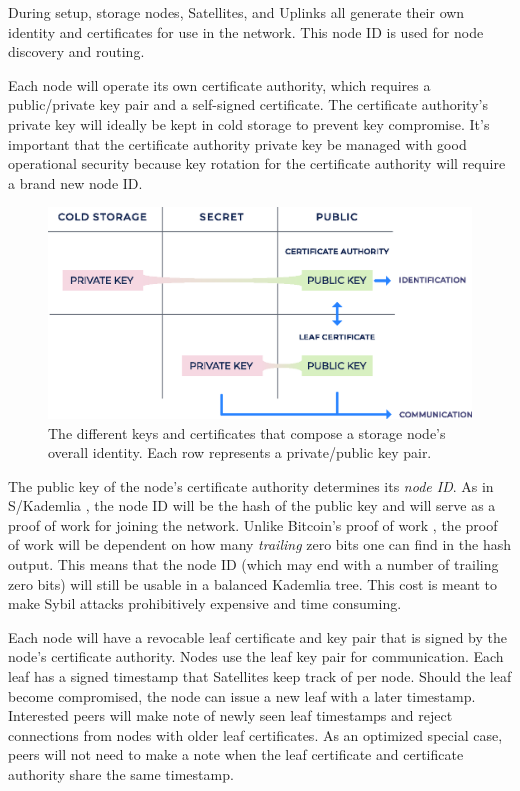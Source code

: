\documentclass[8pt,fleqn,openany]{book}
\begin{document}
During setup, storage nodes, Satellites, and Uplinks all generate their own
identity and certificates for use in the network.
This node ID is used for node discovery and routing.

Each node will operate its own certificate authority, which requires a
public/private key pair and a self-signed certificate. The certificate
authority's private key will ideally be kept in cold storage to prevent key
compromise.
It's important that the certificate authority private key be managed with good
operational security because key rotation for the certificate authority will
require a brand new node ID.

\begin{figure}[!htbp]
\centering
\includegraphics[width=.8\textwidth]{images/identity.eps}
\caption{The different keys and certificates that compose a storage node's
overall identity. Each row represents a private/public key pair.}
\end{figure}

The public key of the node's certificate authority determines its {\em node ID}.
As in S/Kademlia \cite{skad}, the node ID will be the hash of the public key
and will serve as a proof of work for joining the network. Unlike Bitcoin's
proof of work \cite{bitcoin}, the proof of work will be dependent on how many
{\em trailing}
zero bits one can find in the hash output. This means that the node ID (which
may end with a number of trailing zero bits) will
still be usable in a balanced Kademlia \cite{kad} tree.
This cost is meant to make Sybil attacks prohibitively expensive and time
consuming.

Each node will have a revocable leaf certificate and key pair that is signed by
the node's certificate authority. Nodes use the leaf key pair for
communication. Each leaf has a signed timestamp that Satellites
keep track of per node. Should the leaf become compromised, the node can issue
a new leaf with a later timestamp. Interested peers will make note of newly
seen leaf timestamps and reject connections from nodes with older leaf
certificates. As an optimized special case, peers will not need to make a note
when the leaf certificate and certificate authority share the same timestamp.
\end{document}
